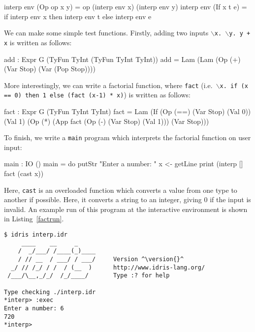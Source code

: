 \begin{code}
interp env (Op op x y) = op (interp env x) (interp env y)
interp env (If x t e)  = if interp env x then interp env t 
                                         else interp env e
\end{code}

\noindent
We can make some simple test functions. Firstly, adding two inputs
\texttt{$\backslash$x. $\backslash$y. y + x} is written as follows:

\begin{code}
add : Expr G (TyFun TyInt (TyFun TyInt TyInt))
add = Lam (Lam (Op (+) (Var Stop) (Var (Pop Stop))))
\end{code}

\noindent
More interestingly, we can write a factorial function, where
\texttt{fact} (i.e.\ \texttt{$\backslash$x. if (x == 0) then 1 else (fact (x-1) * x)}) is written as follows:

\begin{code}
fact : Expr G (TyFun TyInt TyInt)
fact = Lam (If (Op (==) (Var Stop) (Val 0))
               (Val 1) (Op (*) (App fact (Op (-) (Var Stop) (Val 1))) 
                               (Var Stop)))
\end{code}

\noindent
To finish, we write a \texttt{main} program which interprets the factorial function on user input:

\begin{code}
main : IO ()
main = do putStr "Enter a number: "
          x <- getLine
          print (interp [] fact (cast x)) 
\end{code}

\noindent
Here, \texttt{cast} is an overloaded function which converts a value from one type to another if possible.
Here, it converts a string to an integer, giving 0 if the input is invalid.
An example run of this program at the \Idris{} interactive environment is shown in Listing~\ref{factrun}.

\begin{lstlisting}[float=here,caption={Running the well-typed interpreter}, label=factrun, style=stdout]
$ idris interp.idr  
     ____    __     _                                          
    /  _/___/ /____(_)____                                     
    / // __  / ___/ / ___/     Version ^\version{}^
  _/ // /_/ / /  / (__  )      http://www.idris-lang.org/      
 /___/\__,_/_/  /_/____/       Type :? for help                

Type checking ./interp.idr
*interp> :exec 
Enter a number: 6 
720
*interp> 
\end{lstlisting}

